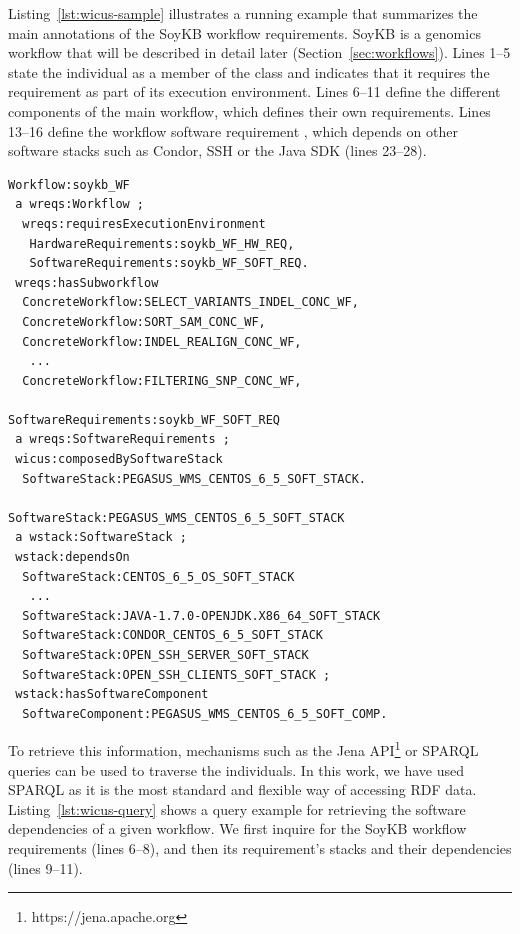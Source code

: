 Listing~\ref{lst:wicus-sample} illustrates a running example that summarizes the 
main annotations of the SoyKB workflow requirements. SoyKB is a genomics workflow
that will be described in detail later (Section~\ref{sec:workflows}). Lines 1--5 state the individual 
 as a member of the  class and indicates 
that it requires the  requirement as 
part of its execution environment. Lines 6--11 define the different components of the main 
workflow, which defines their own requirements. Lines 13--16 define the workflow software 
requirement , which
depends on other software stacks such as Condor, SSH or the Java SDK (lines 23--28).


\begin{lstlisting}[caption={WICUS workflow annotations example.}, label={lst:wicus-sample}, basicstyle=\scriptsize]
Workflow:soykb_WF
 a wreqs:Workflow ;
  wreqs:requiresExecutionEnvironment
   HardwareRequirements:soykb_WF_HW_REQ,
   SoftwareRequirements:soykb_WF_SOFT_REQ.
 wreqs:hasSubworkflow
  ConcreteWorkflow:SELECT_VARIANTS_INDEL_CONC_WF, 
  ConcreteWorkflow:SORT_SAM_CONC_WF, 
  ConcreteWorkflow:INDEL_REALIGN_CONC_WF, 
   ...
  ConcreteWorkflow:FILTERING_SNP_CONC_WF,      
   
SoftwareRequirements:soykb_WF_SOFT_REQ
 a wreqs:SoftwareRequirements ;
 wicus:composedBySoftwareStack
  SoftwareStack:PEGASUS_WMS_CENTOS_6_5_SOFT_STACK.
  
SoftwareStack:PEGASUS_WMS_CENTOS_6_5_SOFT_STACK
 a wstack:SoftwareStack ;
 wstack:dependsOn
  SoftwareStack:CENTOS_6_5_OS_SOFT_STACK 
   ...
  SoftwareStack:JAVA-1.7.0-OPENJDK.X86_64_SOFT_STACK 
  SoftwareStack:CONDOR_CENTOS_6_5_SOFT_STACK 
  SoftwareStack:OPEN_SSH_SERVER_SOFT_STACK 
  SoftwareStack:OPEN_SSH_CLIENTS_SOFT_STACK ;
 wstack:hasSoftwareComponent
  SoftwareComponent:PEGASUS_WMS_CENTOS_6_5_SOFT_COMP.
\end{lstlisting}

To retrieve this information, mechanisms such as the Jena API\footnote{https://jena.apache.org} 
or SPARQL queries can be used to traverse the individuals. In this work, we have 
used SPARQL as it is the most standard and flexible way of accessing RDF data. 
Listing~\ref{lst:wicus-query} shows a query example for retrieving the software 
dependencies of a given workflow. We first inquire for the SoyKB workflow 
requirements (lines 6--8), and then its requirement's stacks and their 
dependencies (lines 9--11).


